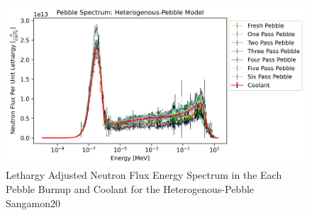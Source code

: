 \begin{figure}[H]
\centering
  \includegraphics[width=0.95\linewidth]{figures/pebs_spec_het_er}
  \caption{Lethargy Adjusted Neutron Flux Energy Spectrum in the Each Pebble Burnup and Coolant for the Heterogenous-Pebble Sangamon20}
  \label{fig:het-peb}
\end{figure}
